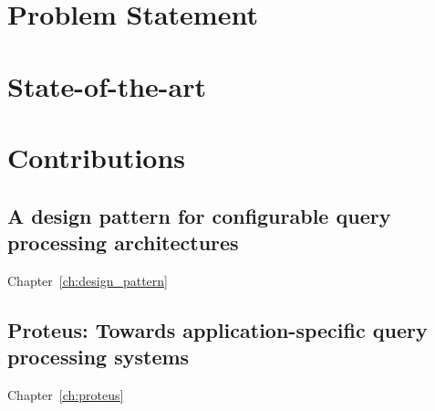 \section{Problem Statement}

\section{State-of-the-art}






\section{Contributions}
\subsection{A design pattern for configurable query processing architectures}
Chapter~\ref{ch:design_pattern}

\subsection{Proteus: Towards application-specific query processing systems}
Chapter~\ref{ch:proteus}